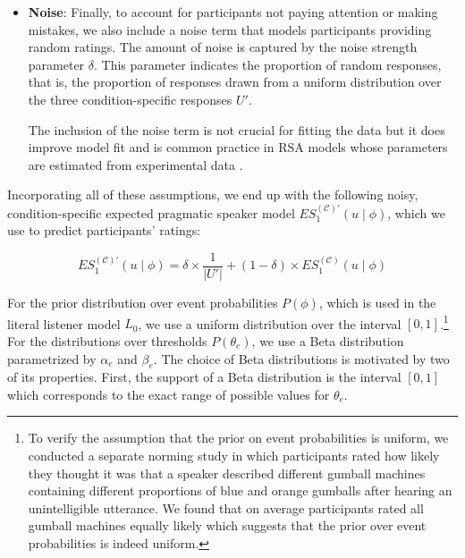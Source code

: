 \documentclass[man, floatsintext]{apa6}
\begin{document}
\begin{itemize}
\item \textbf{Noise}: Finally, to account for participants not paying attention or making mistakes, 
we also include a noise term that models participants providing random ratings.
The amount of noise is captured by the noise strength parameter $\delta$. This parameter
indicates the proportion of random responses, that is, the proportion of responses drawn from a uniform distribution
over the three condition-specific responses $U'$. 

The inclusion of the noise term is not crucial for fitting the data but it does improve model fit and
is common practice in RSA models whose parameters are estimated from experimental data \parencite[see][]{Herbstritt2019,Tessler2019}.

\end{itemize}

\noindent Incorporating all of these assumptions, we end up with the following noisy, condition-specific expected pragmatic speaker 
model $ES_1^{(\mathscr{C})'}(u \mid \phi)$, which we use to predict participants' ratings:

$$ES_1^{(\mathscr{C})'}(u \mid \phi) = \delta \times \frac{1}{|U'|} +  (1 - \delta) \times ES_1^{(\mathscr{C})}(u \mid \phi)$$

For the prior distribution over event probabilities $P(\phi)$, which is used in the literal listener model $L_0$, 
we use a uniform distribution over the interval $[0,1]$.\footnote{To 
verify the assumption that the prior on event probabilities is uniform, we conducted a separate norming study in which participants rated 
how likely they thought it was that a speaker described different gumball machines containing different 
proportions of blue and orange gumballs after hearing an unintelligible utterance. We found that on average 
participants rated all gumball machines equally likely which suggests that the prior over event probabilities is 
indeed uniform.} For the distributions over thresholds $P(\theta_e)$, we use a Beta distribution parametrized by 
$\alpha_e$ and $\beta_e$. The choice of Beta distributions is motivated by two of its properties. First, the support of a Beta distribution 
is the interval $[0,1]$ which corresponds to the exact range of possible values for $\theta_e$.
\end{document}

